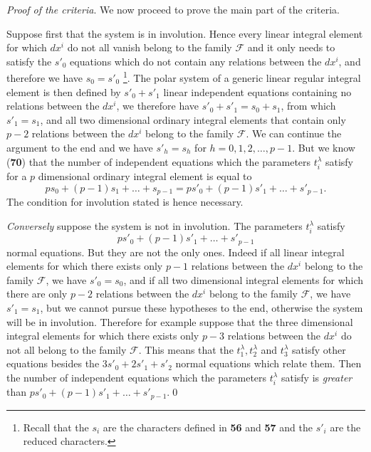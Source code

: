 \vspace{12pt}\fsec \emph{Proof of the criteria}. We now proceed to prove the main part of the criteria.

Suppose first that the system is in involution. Hence every linear integral element for which $dx^{i}$ do not all vanish belong to the family $\mathcal{F}$ and it only needs to satisfy the $s'_{0}$ equations which do not contain any relations between the $dx^{i}$, and therefore we have $s_{0}=s'_{0}$ \footnote{Recall that the $s_{i}$ are the characters defined in \textsection\textbf{56} and \textsection\textbf{57} and the $s'_{i}$ are the reduced characters.}. The polar system of a generic linear regular integral element is then defined by $s'_{0}+s'_{1}$ linear independent equations containing no relations between the $dx^{i}$, we therefore have $s'_{0}+s'_{1}=s_{0}+s_{1}$, from which $s'_{1}=s_{1}$, and all two dimensional ordinary integral elements that contain only $p-2$ relations between the $dx^{i}$ belong to the family $\mathcal{F}$. We can continue the argument to the end and we have $s'_{h}=s_{h}$ for $h=0,1,2,\dots,p-1$. But we know (\textsection\textbf{70}) that the number of independent equations which the parameters $t_{i}^{\lambda}$ satisfy for a $p$ dimensional ordinary integral element is equal to
\[
ps_{0}+(p-1)s_{1}+\dots+s_{p-1}=ps'_{0}+(p-1)s'_{1}+\dots+s'_{p-1}.
\]
The condition for involution stated is hence necessary.

\emph{Conversely} suppose the system is not in involution. The parameters $t_{i}^{\lambda}$ satisfy
\[
ps'_{0}+(p-1)s'_{1}+\dots+s'_{p-1}
\]
normal equations. But they are not the only ones. Indeed if all linear integral elements for which there exists only $p-1$ relations between the $dx^{i}$ belong to the family $\mathcal{F}$, we have $s'_{0}=s_{0}$, and if all two dimensional integral elements for which there are only $p-2$ relations between the $dx^{i}$ belong to the family $\mathcal{F}$, we have $s'_{1}=s_{1}$, but we cannot pursue these hypotheses to the end, otherwise the system will be in involution.  Therefore for example suppose that the three dimensional integral elements for which there exists only $p-3$ relations between the $dx^{i}$ do not all belong to the family $\mathcal{F}$. This means that the $t_{1}^{\lambda},t_{2}^{\lambda}$ and $t_{3}^{\lambda}$ satisfy other equations besides the $3s'_{0}+2s'_{1}+s'_{2}$ normal equations which relate them. Then the number of independent equations  which the parameters $t_{i}^{\lambda}$ satisfy is \emph{greater} than $ps'_{0}+(p-1)s'_{1}+\dots+s'_{p-1}$.\qed

